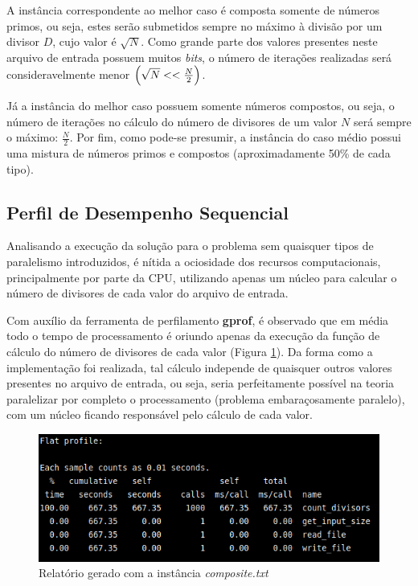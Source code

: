\documentclass[a4paper, 12pt]{article}
\begin{document}
A instância correspondente ao melhor caso é composta somente de números primos, ou seja, estes serão submetidos sempre no máximo à divisão por um divisor \(D\), cujo valor é \(\sqrt{N}\). Como grande parte dos valores presentes neste arquivo de entrada possuem muitos \emph{bits}, o número de iterações realizadas será consideravelmente menor $\Bigl(\sqrt{N} << \frac{N}{2}\Bigl)$.

Já a instância do melhor caso possuem somente números compostos, ou seja, o número de iterações no cálculo do número de divisores de um valor \(N\) será sempre o máximo: \(\frac{N}{2}\). Por fim, como pode-se presumir, a instância do caso médio possui uma mistura de números primos e compostos (aproximadamente 50\% de cada tipo).

\subsection{Perfil de Desempenho Sequencial}

Analisando a execução da solução para o problema sem quaisquer tipos de paralelismo introduzidos, é nítida a ociosidade dos recursos computacionais, principalmente por parte da CPU, utilizando apenas um núcleo para calcular o número de divisores de cada valor do arquivo de entrada.

Com auxílio da ferramenta de perfilamento \textbf{gprof}\footnotemark, é observado que em média todo o tempo de processamento é oriundo apenas da execução da função de cálculo do número de divisores de cada valor (Figura \ref{fig:map1}). Da forma como a implementação foi realizada, tal cálculo independe de quaisquer outros valores presentes no arquivo de entrada, ou seja, seria perfeitamente possível na teoria paralelizar por completo o processamento (problema embaraçosamente paralelo), com um núcleo ficando responsável pelo cálculo de cada valor.


\begin{figure}[H]
    \centering
    \includegraphics[width=1\textwidth]{Images/gprof.png}
    \vspace*{-0.5cm}
    \caption{Relatório gerado com a instância \emph{composite.txt}}
    \label{fig:map1}
\end{figure}
\end{document}
